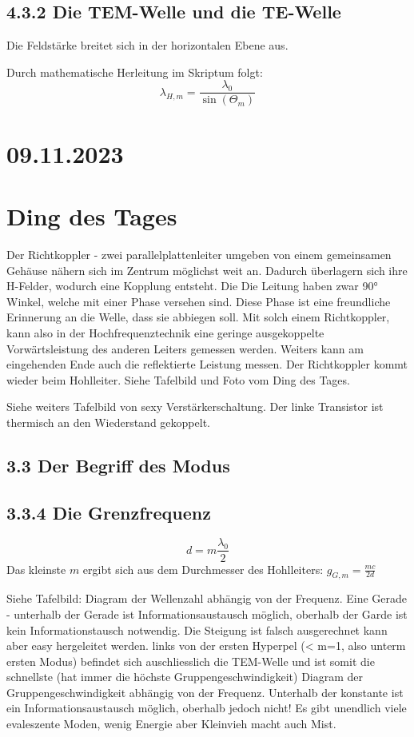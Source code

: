 \documentclass[a4paper]{article}
\begin{document}
\subsection*{4.3.2 Die TEM-Welle und die TE-Welle}
Die Feldstärke breitet sich in der horizontalen Ebene aus.

Durch mathematische Herleitung im Skriptum folgt:
\[ \lambda_{H,m}=\frac{\lambda_{0}}{\sin(\Theta_{m})} \]

\section*{09.11.2023}
\section*{Ding des Tages}
Der Richtkoppler - zwei parallelplattenleiter umgeben von einem gemeinsamen Gehäuse nähern sich im Zentrum möglichst weit an. Dadurch überlagern sich ihre H-Felder, wodurch eine Kopplung entsteht. Die Die Leitung haben zwar 90° Winkel, welche mit einer Phase versehen sind. Diese Phase ist eine freundliche Erinnerung an die Welle, dass sie abbiegen soll.
Mit solch einem Richtkoppler, kann also in der Hochfrequenztechnik eine geringe ausgekoppelte Vorwärtsleistung des anderen Leiters gemessen werden. Weiters kann am eingehenden Ende auch die reflektierte Leistung messen. Der Richtkoppler kommt wieder beim Hohlleiter.
Siehe Tafelbild und Foto vom Ding des Tages.

Siehe weiters Tafelbild von sexy Verstärkerschaltung. Der linke Transistor ist thermisch an den Wiederstand gekoppelt.

\subsection*{3.3 Der Begriff des Modus}
\subsection*{3.3.4 Die Grenzfrequenz}
\[ d=m \frac{\lambda_{0}}{2} \]
Das kleinste $m$ ergibt sich aus dem Durchmesser des Hohlleiters: $g_{G,m}=\frac{mc}{2d}$ 

Siehe Tafelbild:
Diagram der Wellenzahl abhängig von der Frequenz. Eine Gerade - unterhalb der Gerade ist Informationsaustausch möglich, oberhalb der Garde ist kein Informationstausch notwendig. Die Steigung ist falsch ausgerechnet kann aber easy hergeleitet werden.
links von der ersten Hyperpel (< m=1, also unterm ersten Modus) befindet sich auschliesslich die TEM-Welle und ist somit die schnellste (hat immer die höchste Gruppengeschwindigkeit)
Diagram der Gruppengeschwindigkeit abhängig von der Frequenz. Unterhalb der konstante ist ein Informationsaustausch möglich, oberhalb jedoch nicht!
Es gibt unendlich viele evaleszente Moden, wenig Energie aber Kleinvieh macht auch Mist.
\end{document}
